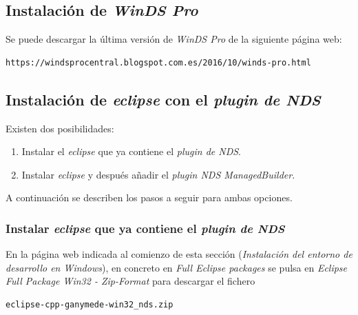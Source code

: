 \subsection{Instalación de \textit{WinDS Pro}}
Se puede descargar la última versión de \textit{WinDS Pro} de la siguiente página web:
\begin{verbatim}
https://windsprocentral.blogspot.com.es/2016/10/winds-pro.html
\end{verbatim} 

\subsection{Instalación de \textit{eclipse} con el \textit{plugin de NDS}}
Existen dos posibilidades:
\begin{enumerate}
\item Instalar el \textit{eclipse} que ya contiene el \textit{plugin de NDS}.
\item Instalar \textit{eclipse} y después añadir el \textit{plugin NDS ManagedBuilder}.
\end{enumerate}

A continuación se describen los pasos a seguir para ambas opciones.

\subsubsection{Instalar \textit{eclipse} que ya contiene el \textit{plugin de NDS}}  
En la página web indicada al comienzo de esta sección (\textit{Instalación del entorno de desarrollo en Windows}), en concreto en \textit{Full Eclipse packages} se pulsa en \textit{Eclipse Full Package Win32 - Zip-Format} para descargar el fichero
\begin{verbatim}
eclipse-cpp-ganymede-win32_nds.zip
\end{verbatim}

